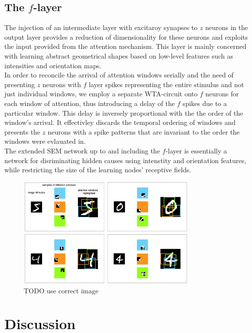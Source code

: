 \documentclass{report}
\begin{document}
\section{The $f$-layer}

The injection of an intermediate layer with excitaroy synapses to $z$ neurons in the output layer provides a reduction of dimensionality for these neurons and exploits the input provided from the attention mechanism. This layer is mainly concerned with learning abstract geometrical shapes based on low-level features such as intensities and orientation maps.\\
In order to reconcile the arrival of attention windows serially and the need of presenting $z$ neurons with $f$ layer spikes representing the entire stimulus and not just individual windows, we employ a separate WTA-circuit onto $f$ neurons for each window of attention, thus introducing a delay of the $f$ spikes due to a particular window. This delay is inversely proportional with the the order of the window's arrival. It effectivley discards the temporal ordering of windows and presents the $z$ neurons with a spike patterns that are invariant to the order the windows were evlauated in.\\

The extended SEM network up to and including the $f$-layer is essentially a network for disriminating hidden causes using intenstity and orientation features, while restricting the size of the learning nodes' receptive fields.\\

\begin{figure}[ht]
\centering
\includegraphics[width=0.8\textwidth]{attention_windows_examples}
\caption{TODO use correct image
\label{fig:attention_windows_examples}}
\end{figure}

\chapter{Discussion}
\end{document}
